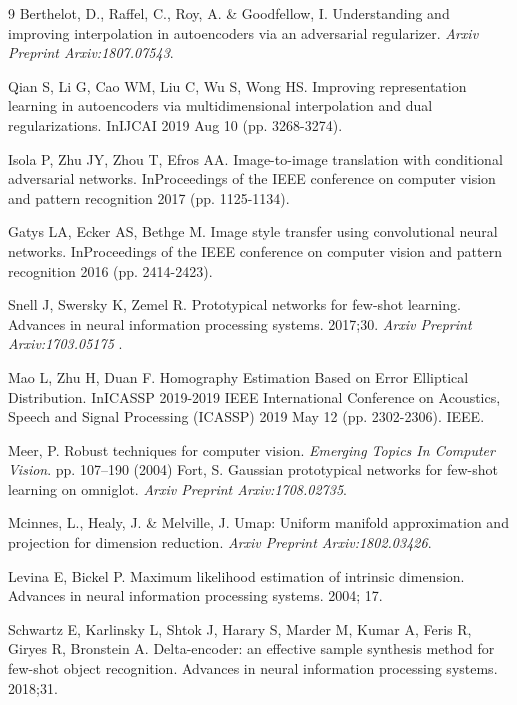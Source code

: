 \documentclass{article}
\begin{document}
\begin{thebibliography}{9}
Berthelot, D., Raffel, C., Roy, A. \& Goodfellow, I. Understanding and improving interpolation in autoencoders via an adversarial regularizer. 
{\em Arxiv Preprint Arxiv:1807.07543}.
  
 
Qian S, Li G, Cao WM, Liu C, Wu S, Wong HS. Improving representation learning in autoencoders via multidimensional interpolation and dual regularizations. InIJCAI 2019 Aug 10 (pp. 3268-3274).

Isola P, Zhu JY, Zhou T, Efros AA. Image-to-image translation with conditional adversarial networks. InProceedings of the IEEE conference on computer vision and pattern recognition 2017 (pp. 1125-1134).

Gatys LA, Ecker AS, Bethge M. Image style transfer using convolutional neural networks. InProceedings of the IEEE conference on computer vision and pattern recognition 2016 (pp. 2414-2423).


Snell J, Swersky K, Zemel R. Prototypical networks for few-shot learning. Advances in neural information processing systems. 2017;30. {\em Arxiv Preprint Arxiv:1703.05175}  .
 
Mao L, Zhu H, Duan F. Homography Estimation Based on Error Elliptical Distribution. InICASSP 2019-2019 IEEE International Conference on Acoustics, Speech and Signal Processing (ICASSP) 2019 May 12 (pp. 2302-2306). IEEE.

Meer, P. Robust techniques for computer vision. 
{\em Emerging Topics In Computer Vision}.
 pp. 107--190 (2004)
Fort, S. Gaussian prototypical networks for few-shot learning on omniglot. 
{\em Arxiv Preprint Arxiv:1708.02735}.
 
Mcinnes, L., Healy, J. \& Melville, J. Umap: Uniform manifold approximation and projection for dimension reduction. 
{\em Arxiv Preprint Arxiv:1802.03426}.

 
Levina E, Bickel P. Maximum likelihood estimation of intrinsic dimension. Advances in neural information processing systems. 2004; 17.

Schwartz E, Karlinsky L, Shtok J, Harary S, Marder M, Kumar A, Feris R, Giryes R, Bronstein A. Delta-encoder: an effective sample synthesis method for few-shot object recognition. Advances in neural information processing systems. 2018;31.
 

\end{thebibliography}
\end{document}

